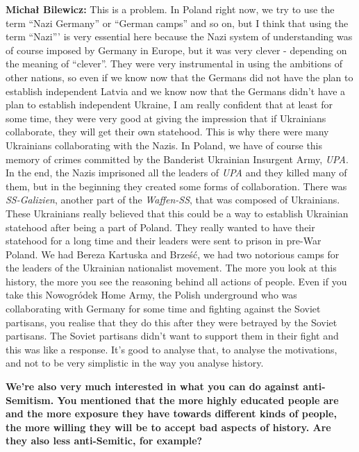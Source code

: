 \textbf{Michał Bilewicz:} This is a problem. In Poland right now, we try to use the term ``Nazi Germany'' or ``German camps'' and so on, but I think that using the term ``Nazi''' is very essential here because the Nazi system of understanding was of course imposed by Germany in Europe, but it was very clever - depending on the meaning of ``clever''. They were very instrumental in using the ambitions of other nations, so even if we know now that the Germans did not have the plan to establish independent Latvia and we know now that the Germans didn't have a plan to establish independent Ukraine, I am really confident that at least for some time, they were very good at giving the impression that if Ukrainians collaborate, they will get their own statehood. This is why there were many Ukrainians collaborating with the Nazis. In Poland, we have of course this memory of crimes committed by the Banderist Ukrainian Insurgent Army, \textit{UPA}. In the end, the Nazis imprisoned all the leaders of \textit{UPA} and they killed many of them, but in the beginning they created some forms of collaboration. There was \textit{SS-Galizien}, another part of the \textit{Waffen-SS}, that was composed of Ukrainians. These Ukrainians really believed that this could be a way to establish Ukrainian statehood after being a part of Poland. They really wanted to have their statehood for a long time and their leaders were sent to prison in pre-War Poland. We had Bereza Kartuska and Brześć, we had two notorious camps for the leaders of the Ukrainian nationalist movement. The more you look at this history, the more you see the reasoning behind all actions of people. Even if you take this Nowogródek Home Army, the Polish underground who was collaborating with Germany for some time and fighting against the Soviet partisans, you realise that they do this after they were betrayed by the Soviet partisans. The Soviet partisans didn't want to support them in their fight and this was like a response. It's good to analyse that, to analyse the motivations, and not to be very simplistic in the way you analyse history. 

\textbf{We’re also very much interested in what you can do against anti-Semitism. You mentioned that the more highly educated people are and the more exposure they have towards different kinds of people, the more willing they will be to accept bad aspects of history. Are they also less anti-Semitic, for example?} 

